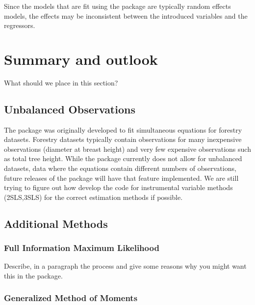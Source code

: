 \documentclass[article]{jss}
\begin{document}
Since the models that are fit using the  package are
typically random effects models, the effects may be inconsistent
between the introduced variables and the regressors.


\section{Summary and outlook}\label{sec:Summmary}

What should we place in this section?


\subsection{Unbalanced Observations}\label{sec:summary_unbalanced_data}

The  package was originally developed to fit
simultaneous equations for forestry datasets. Forestry datasets
typically contain observations for many inexpensive observations
(diameter at breast height) and very few expensive observations such
as total tree height. While the package currently does not allow for
unbalanced datasets, data where the equations contain different
numbers of observations, future releases of the package will have that
feature implemented. We are still trying to figure out how develop the
code for instrumental variable methods (2SLS,3SLS) for the correct
estimation methods if possible.

\subsection{Additional Methods}\label{sec:summary_additional_methods}


\subsubsection{Full Information Maximum Likelihood}

Describe, in a paragraph the process and give some reasons why you
might want this in the package. 


\subsubsection{Generalized Method of Moments}
\end{document}
